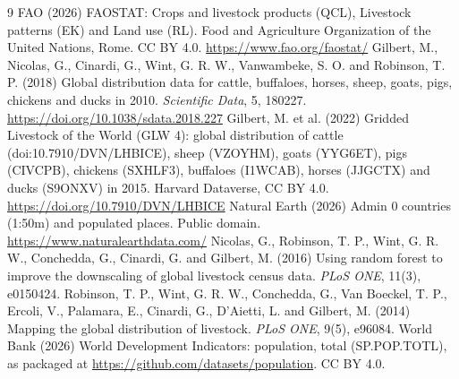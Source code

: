\documentclass[11pt,a4paper]{article}
\begin{document}
\begin{thebibliography}{9}
 FAO (2026) FAOSTAT: Crops and livestock products (QCL), Livestock patterns (EK) and Land use (RL). Food and Agriculture Organization of the United Nations, Rome. CC BY 4.0. \url{https://www.fao.org/faostat/}
 Gilbert, M., Nicolas, G., Cinardi, G., Wint, G. R. W., Vanwambeke, S. O. and Robinson, T. P. (2018) Global distribution data for cattle, buffaloes, horses, sheep, goats, pigs, chickens and ducks in 2010. \emph{Scientific Data}, 5, 180227. \url{https://doi.org/10.1038/sdata.2018.227}
 Gilbert, M. et al. (2022) Gridded Livestock of the World (GLW 4): global distribution of cattle (doi:10.7910/DVN/LHBICE), sheep (VZOYHM), goats (YYG6ET), pigs (CIVCPB), chickens (SXHLF3), buffaloes (I1WCAB), horses (JJGCTX) and ducks (S9ONXV) in 2015. Harvard Dataverse, CC BY 4.0. \url{https://doi.org/10.7910/DVN/LHBICE}
 Natural Earth (2026) Admin 0 countries (1:50m) and populated places. Public domain. \url{https://www.naturalearthdata.com/}
 Nicolas, G., Robinson, T. P., Wint, G. R. W., Conchedda, G., Cinardi, G. and Gilbert, M. (2016) Using random forest to improve the downscaling of global livestock census data. \emph{PLoS ONE}, 11(3), e0150424.
 Robinson, T. P., Wint, G. R. W., Conchedda, G., Van Boeckel, T. P., Ercoli, V., Palamara, E., Cinardi, G., D'Aietti, L. and Gilbert, M. (2014) Mapping the global distribution of livestock. \emph{PLoS ONE}, 9(5), e96084.
 World Bank (2026) World Development Indicators: population, total (SP.POP.TOTL), as packaged at \url{https://github.com/datasets/population}. CC BY 4.0.
\end{thebibliography}
\end{document}
